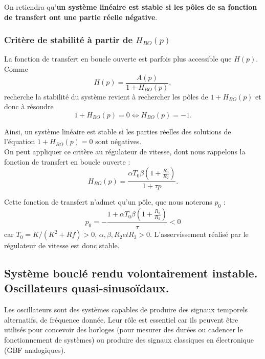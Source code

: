 \documentclass[11pt,a4paper]{report}
\begin{document}
On retiendra qu'\textbf{un système linéaire est stable si les pôles de sa fonction de transfert ont une partie réelle négative}.

\subsubsection{Critère de stabilité à partir de $H_{BO}(p)$}

La fonction de transfert en boucle ouverte est parfois plus accessible que $H(p)$. Comme
\begin{equation}
	H(p) = \frac{A(p)}{1 + H_{BO}(p)},
\end{equation}
recherche la stabilité du système revient à rechercher les pôles de $1 + H_{BO}(p)$ et donc à résoudre
\begin{equation}
	1 + H_{BO}(p) = 0 \Leftrightarrow H_{BO}(p) = - 1.
\end{equation}

Ainsi, un système linéaire est stable si les parties réelles des solutions de l'équation $1 + H_{BO}(p) = 0$ sont négatives.\\

On peut appliquer ce critère au régulateur de vitesse, dont nous rappelons la fonction de transfert en boucle ouverte :
\begin{equation}
	 H_{BO}(p) = \frac{\alpha T_0\beta\left(1+\frac{R_3}{R_2}\right)}{1+\tau p}.
\end{equation}

Cette fonction de transfert n'admet qu'un pôle, que nous noterons $p_0$ :
\begin{equation}
	p_0 = - \frac{1 + \alpha T_0 \beta \left(1 + \frac{R_3}{R_2}\right)}{\tau} < 0
\end{equation}
car $T_0 = K/(K^2 + Rf) > 0$, $\alpha, \beta, R_2 et R_3 > 0$. L'asservissement réalisé par le régulateur de vitesse est donc stable.

\subsection{Système bouclé rendu volontairement instable.\\ Oscillateurs quasi-sinusoïdaux.}

Les oscillateurs sont des systèmes capables de produire des signaux temporels alternatifs, de fréquence donnée. Leur rôle est essentiel car ils peuvent être utilisés pour concevoir des horloges (pour mesurer des durées ou cadencer le fonctionnement de systèmes) ou produire des signaux classiques en électronique (GBF analogiques).\\
\end{document}
